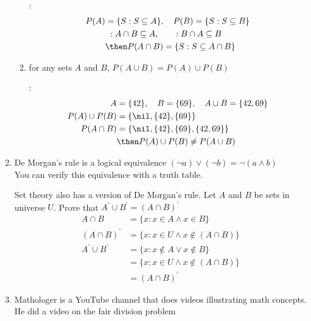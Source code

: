 \documentclass[basic, header]{nosvagor-notes}
\begin{document}
\begin{enumerate}[itemsep=5em]
\begin{enumerate}
          :
          \begin{align*}
            P(A) &= \{ S : S \subseteq A\}, \quad P(B) = \{ S : S \subseteq B \} \\
                 & ~: A \cap B \subseteq A, \qquad  : B \cap A \subseteq B \\
                 & \then P(A \cap B) = \{ S : S \subseteq A \cap B \}
          \end{align*}


        \item for any sets $A$ and $B$, $P(A\cup B) = P(A) \cup P(B)$

          :
          \begin{align*}
            A &= \{42\}, \quad B = \{69\}, \quad A \cup B = \{ 42, 69 \} \\
            P(A) \cup P(B) &= \{\nil, \{ 42 \}, \{ 69 \} \} \\
            P (A \cap B ) &= \{ \nil, \{ 42 \}, \{ 69 \}, \{ 42, 69 \} \} \\
                          &\then P(A) \cup P(B) \neq P(A \cup B)
          \end{align*}


      \end{enumerate}

  \newpage %

    \item De Morgan's rule is a logical equivalence $(\lnot a) \lor (\lnot b) =
      \lnot (a \land b)$\\ You can verify this equivalence with a truth table.

      Set theory also has a version of De Morgan's rule. Let $A$ and $B$ be sets
      in universe $U$. Prove that $A^{'} \cup B^{'} = (A \cap B)^{'}$
      \begin{align*}
        A \cap B &= \{ x : x \in A \land x \in B \} \\
        (A \cap B)^{'}   & = \{ x : x \in U \land x \not\in (A \cap B) \}  \\
        A^{'} \cup B^{'} & = \{ x : x \not\in A \lor x \not\in B \} \\
                         & = \{ x : x \in U \land x \not\in (A \cap B) \} \\
                         & = (A \cap B)^{'}
      \end{align*}

    \item Mathologer is a YouTube channel that does videos illustrating math
      concepts. He did a video on the fair division problem
      \begin{center}
      \end{center}


\end{enumerate}
\end{document}
